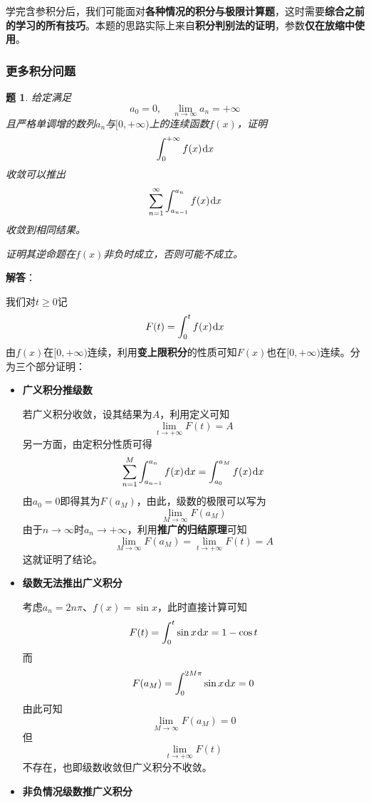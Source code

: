 \documentclass[a4paper,UTF8,fontset=windows,AutoFakeBold]{ctexart}
\newcommand*{\dr}{\hspace{0.07em}\mathrm{d}}
\newcommand*{\suminf}[1][n=1]{\sum_{#1}^\infty}
\newcommand*{\note}{\noindent *}
\theoremstyle{ex}
\newtheorem{exercise}{题}
\newcommand{\sol}[1]{{\vspace{5pt}\kaishu\noindent\textbf{解答}：\vspace{-3pt}
\begin{compactitem}
    \item[] #1
\end{compactitem}
}}
\begin{document}
\note 学完含参积分后，我们可能面对\textbf{各种情况的积分与极限计算题}，这时需要\textbf{综合之前的学习的所有技巧}。本题的思路实际上来自\textbf{积分判别法的证明}，参数\textbf{仅在放缩中使用}。

\subsubsection{更多积分问题}

\begin{framed}
\begin{exercise}\label{func to series}
    给定满足
    $$a_0=0,\quad\lim_{n\to\infty}a_n=+\infty$$
    且严格单调增的数列$a_n$与$[0,+\infty)$上的连续函数$f(x)$，证明
    $$\int_0^{+\infty}f(x)\dr x$$
    收敛可以推出
    $$\suminf\int_{a_{n-1}}^{a_n}f(x)\dr x$$
    收敛到相同结果。

    证明其逆命题在$f(x)$非负时成立，否则可能不成立。
\end{exercise}
\sol{
    我们对$t\ge0$记
    $$F(t)=\int_0^tf(x)\dr x$$
    由$f(x)$在$[0,+\infty)$连续，利用\textbf{变上限积分}的性质可知$F(x)$也在$[0,+\infty)$连续。分为三个部分证明：
    \begin{itemize}
        \item \textbf{广义积分推级数}
        
        若广义积分收敛，设其结果为$A$，利用定义可知
        $$\lim_{t\to+\infty}F(t)=A$$
        另一方面，由定积分性质可得
        $$\sum_{n=1}^M\int_{a_{n-1}}^{a_n}f(x)\dr x=\int_{a_0}^{a_M}f(x)\dr x$$
        由$a_0=0$即得其为$F(a_M)$，由此，级数的极限可以写为
        $$\lim_{M\to\infty}F(a_M)$$
        由于$n\to\infty$时$a_n\to+\infty$，利用\textbf{推广的归结原理}可知
        $$\lim_{M\to\infty}F(a_M)=\lim_{t\to+\infty}F(t)=A$$
        这就证明了结论。
        
        \item \textbf{级数无法推出广义积分}
        
        考虑$a_n=2n\pi$、$f(x)=\sin x$，此时直接计算可知
        $$F(t)=\int_0^t\sin x\dr x=1-\cos t$$
        而
        $$F(a_M)=\int_0^{2M\pi}\sin x\dr x=0$$
        由此可知
        $$\lim_{M\to\infty}F(a_M)=0$$
        但
        $$\lim_{t\to+\infty}F(t)$$
        不存在，也即级数收敛但广义积分不收敛。
        
        \item \textbf{非负情况级数推广义积分}
        

\end{itemize}}
\end{framed}
\end{document}
